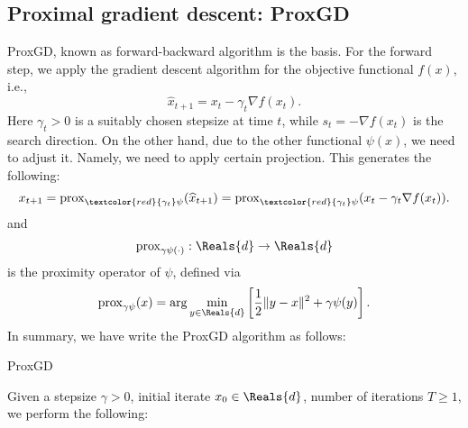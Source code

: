 \begin{itemize}
\newpage
\subsection{Proximal gradient descent: ProxGD} 

ProxGD, known as forward-backward algorithm is the basis. For the forward step, we apply the gradient descent algorithm for the objective functional $f(x)$, i.e., 
\begin{equation}
\widehat{x}_{t+1} = x_t - \gamma_t \nabla f(x_t). 
\end{equation}
Here $\gamma_t > 0$ is a suitably chosen stepsize at time $t$, while $s_t = -\nabla f(x_t)$ is the search direction. 
On the other hand, due to the other functional $\psi(x)$, we need to adjust it. Namely, we need to apply certain projection. This generates the following:
\begin{equation}
x_{t+1} = {\rm prox}_{\textcolor{red}{\gamma_t}  \psi} (\widehat{x}_{t+1}) = {\rm prox}_{\textcolor{red}{\gamma_t} \psi} (x_t - \gamma_t \nabla f(x_t)). 
\end{equation}
 and 
\begin{equation}
{\rm prox}_{\gamma \psi(\cdot)} : \Reals{d} \rightarrow \Reals{d}    
\end{equation}
is the proximity operator of $\psi$, defined via 
\begin{equation}
{\rm prox}_{\gamma \psi}(x) = {\rm arg}\min_{y \in \Reals{d}} \left [ \frac{1}{2} \|y - x\|^2 + \gamma \psi(y) \right ]. 
\end{equation}
In summary, we have write the ProxGD algorithm as follows: 

\begin{algorithm}
\caption{ProxGD}\label{alg:maingd}
Given a stepsize $\gamma > 0$, initial iterate $x_0 \in \Reals{d}$, number of iterations $T \geq 1$, we perform the following:  
\begin{algorithmic}


%
%    
%
\EndFor
\end{algorithmic}
\end{algorithm}



\end{itemize}
